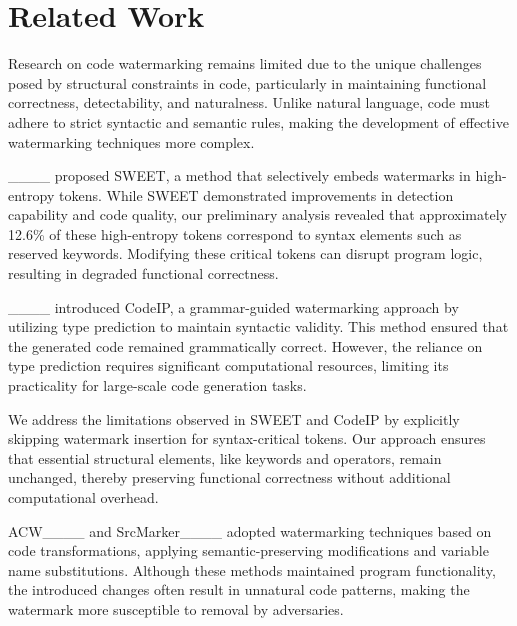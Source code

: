 \section{Related Work}
Research on code watermarking remains limited due to the unique 
challenges posed by structural constraints in code, particularly 
in maintaining functional correctness, detectability, and naturalness.
Unlike natural language, code must adhere to strict syntactic and 
semantic rules, making the development of effective watermarking 
techniques more complex.

____ proposed SWEET,
a method that selectively embeds watermarks in high-entropy tokens.
While SWEET demonstrated improvements in detection capability 
and code quality, our preliminary analysis revealed that approximately 
12.6\% of these high-entropy tokens correspond to syntax elements 
such as reserved keywords. 
Modifying these critical tokens can disrupt program logic, 
resulting in degraded functional correctness.

____ introduced CodeIP, a grammar-guided 
watermarking approach by utilizing type prediction to maintain 
syntactic validity. 
This method ensured that the generated code remained grammatically correct. 
However, the reliance on type prediction requires significant 
computational resources, limiting its practicality for 
large-scale code generation tasks.

We address the limitations observed in SWEET and CodeIP by 
explicitly skipping watermark insertion for syntax-critical tokens. 
Our approach ensures that essential structural elements, 
like keywords and operators, remain unchanged, 
thereby preserving functional correctness without additional 
computational overhead.

ACW____ and SrcMarker____ 
adopted watermarking techniques based on code transformations, 
applying semantic-preserving modifications and variable name substitutions. 
Although these methods maintained program functionality, the introduced 
changes often result in unnatural code patterns, 
making the watermark more susceptible 
to removal by adversaries.

